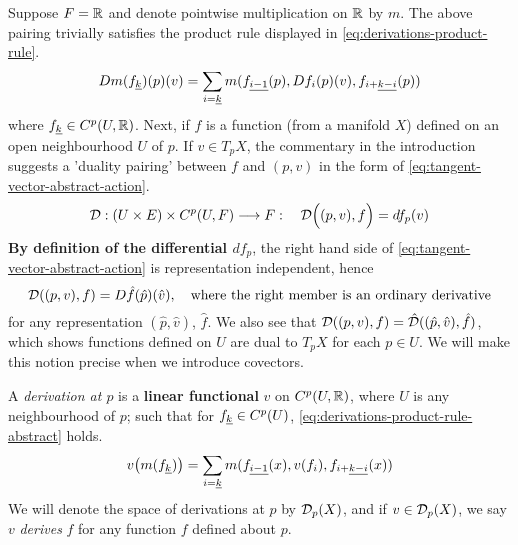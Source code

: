 \documentclass[../main-manifolds.tex]{subfiles}
\begin{document}
Suppose $F = \mathbb{R}$ and denote pointwise multiplication on $\mathbb{R}$ by $m$. The above pairing trivially satisfies the product rule displayed in \cref{eq:derivations-product-rule}.
\begin{equation}\label{eq:derivations-product-rule}
    Dm(\UL{f}[k])(p)(v) = \sum_{i=\underline{k}}m(\UL{f}[i-1](p),D f_i(p)(v),\UL{f}[i+][k-i](p))
\end{equation}
where $\UL{f}[k]\in C^p(U,\real)$. Next, if $f$ is a function (from a manifold $X$) defined on an open neighbourhood $U$ of $p$. If $v\in T_p X$, the commentary in the introduction suggests a 'duality pairing' between $f$ and $(p,v)$ in the form of \cref{eq:tangent-vector-abstract-action}.
\begin{equation}\label{eq:tangent-vector-abstract-action}
    \mathcal{D}: (U\times E)\times C^p(U,F)\longrightarrow F:\quad \mathcal{D}\qty\Big((p,v),f) = df_p(v)
\end{equation}
\textbf{By definition of the differential $df_p$}, the right hand side of \cref{eq:tangent-vector-abstract-action} is representation independent, hence
\begin{equation}\label{eq:tangent-vector-concrete-action}
    \mathcal{D}((p,v), f) =  D\hat{f}(\hat{p})(\hat{v}),\quad\text{where the right member is an ordinary derivative}
\end{equation}
for any representation $(\hat{p},\hat{v})$, $\hat{f}$. We also see that $\mathcal{D}((p,v), f) = \hat{\mathcal{D}}((\hat{p},\hat{v}),\hat{f})$, which shows functions defined on $U$ are dual to $T_p X$ for each $p\in U$. We will make this notion precise when we introduce covectors.

\begin{definition}[Derivation at $p$]\label{def:derivation-at-p}
A \emph{derivation at $p$} is a \textbf{linear functional} $v$ on $C^p(U,\mathbb{R})$, where $U$ is any neighbourhood of $p$; such that for $\UL{f}[k]\in C^p(U)$, \cref{eq:derivations-product-rule-abstract} holds. 
\begin{equation}\label{eq:derivations-product-rule-abstract}
    v\qty(m(\UL{f}[k])) = \sum_{i=\underline{k}}m(\UL{f}[i-1](x), v(f_i),\UL{f}[i+][k-i](x))
\end{equation}
We will denote the space of derivations at $p$ by $\mathcal{D}_p(X)$, and if $v\in \mathcal{D}_p(X)$, we say $v$ \emph{derives} $f$ for any function $f$ defined about $p$.
\end{definition}
\end{document}
